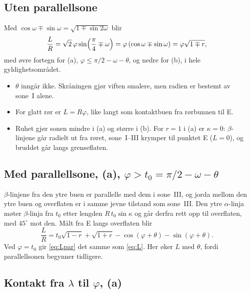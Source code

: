 \documentclass[11pt,a4paper]{article}
\begin{document}
\subsection*{Uten parallellsone}

Med $\cos\omega \mp \sin\omega = \sqrt{1 \mp \sin 2\omega}$ blir
\begin{equation}
  \frac{L}{R} = \sqrt2\,\varphi \sin\Bigl(\frac{\pi}{4} \mp \omega\Bigr)
              = \varphi\,(\cos\omega \mp \sin\omega)
              = \varphi\sqrt{1 \mp r} ,
  \label{eq:L}
\end{equation}
med øvre fortegn for (a), $\varphi \le \pi/2 - \omega - \theta$, og nedre
for (b), i hele gyldighetsområdet.
\begin{itemize}
  \item $\theta$ inngår ikke.  Skråningen gjør viften smalere, men
        radien er bestemt av sone~I alene.
  \item For glatt rør er $L = R\varphi$, like langt som kontaktbuen fra
        rørbunnen til E.
  \item Ruhet gjør sonen mindre i (a) og større i (b).  For $r = 1$ i (a) er
        $\kappa = 0$: $\beta$-linjene går radielt ut fra røret, sone~I--III
        krymper til punktet E ($L = 0$), og bruddet går langs grenseflaten.
\end{itemize}

\subsection*{Med parallellsone, (a), $\varphi > t_0 = \pi/2 - \omega - \theta$}

$\beta$-linjene fra den ytre buen er parallelle med dem i sone~III, og jorda
mellom den ytre buen og overflaten er i samme jevne tilstand som sone~III.
Den ytre $\alpha$-linja møter $\beta$-linja fra $t_0$ etter lengden
$R\,t_0\sin\kappa$ og går derfra rett opp til overflaten, med $45^\circ$ mot
den.  Målt fra E langs overflaten blir
\begin{equation}
  \frac{L}{R} = t_0\sqrt{1 - r} + \sqrt{1 + r} - \cos(\varphi + \theta) - \sin(\varphi + \theta) .
  \label{eq:Lpar}
\end{equation}
Ved $\varphi = t_0$ gir \eqref{eq:Lpar} det samme som \eqref{eq:L}.  Her
øker $L$ med $\theta$, fordi parallellsonen begynner tidligere.

\subsection*{Kontakt fra $\lambda$ til $\varphi$, (a)}
\end{document}
